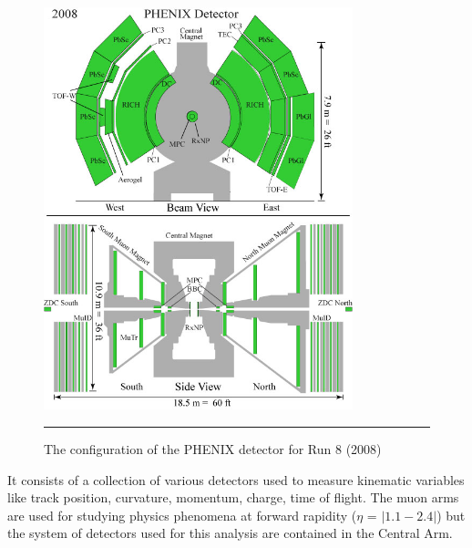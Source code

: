 \begin{figure}[htbp]
  \centering
    \includegraphics[width=0.8\textwidth]{Figures/Phenix_2008.jpg}
    \rule{35em}{0.5pt}
  \caption[PHENIX Detector Configuration for RHIC Run 8 (2008)]{The configuration of the PHENIX detector for Run 8 (2008)}
  \label{fig:run8config}
\end{figure}
It consists of a collection of various detectors used to measure kinematic variables like track position, curvature, momentum, charge, time of flight. The muon arms are used for studying physics phenomena at forward rapidity ($\eta$ = $|1.1-2.4|$)\citep{rapidityref} but the system of detectors used for this analysis are contained in the Central Arm.  

